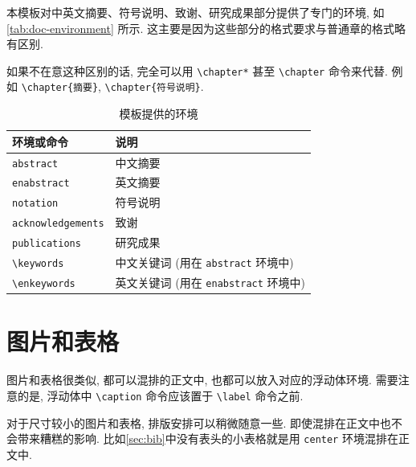 本模板对中英文摘要、符号说明、致谢、研究成果部分提供了专门的环境,
如\autoref{tab:doc-environment} 所示.
这主要是因为这些部分的格式要求与普通章的格式略有区别.

如果不在意这种区别的话, 完全可以用 \verb|\chapter*| 甚至 \verb|\chapter| 命令来代替.
例如 \verb|\chapter{摘要}|, \verb|\chapter{符号说明}|.

\begin{table}[!htb]
  \caption{模板提供的环境}
  \label{tab:doc-environment}
  \centering
  \begin{tabular}{ll}
    \toprule
    环境或命令              & 说明\\
    \midrule
    \verb|abstract|         & 中文摘要\\
    \verb|enabstract|       & 英文摘要\\
    \verb|notation|         & 符号说明\\
    \verb|acknowledgements| & 致谢\\
    \verb|publications|     & 研究成果\\
    \midrule
    \verb|\keywords|        & 中文关键词 (用在 \verb|abstract| 环境中)\\
    \verb|\enkeywords|      & 英文关键词 (用在 \verb|enabstract| 环境中)\\
    \bottomrule
  \end{tabular}
\end{table}

\section{图片和表格}

图片和表格很类似, 都可以混排的正文中, 也都可以放入对应的浮动体环境.
需要注意的是, 浮动体中 \verb|\caption| 命令应该置于 \verb|\label| 命令之前.

对于尺寸较小的图片和表格, 排版安排可以稍微随意一些.
即使混排在正文中也不会带来糟糕的影响.
比如\autoref{sec:bib}中没有表头的小表格就是用 \verb|center| 环境混排在正文中.

